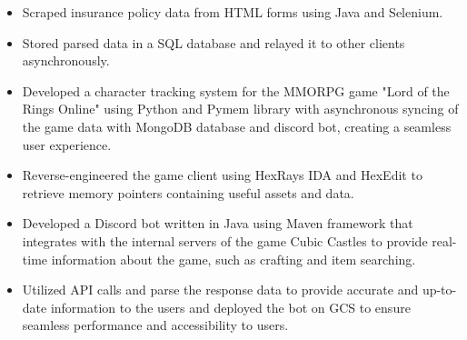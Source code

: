 \documentclass[10pt,a4paper,ragged2e]{altacv}
\begin{document}
\divider

\begin{itemize}
\item Scraped insurance policy data from HTML forms using Java and Selenium.
\item Stored parsed data in a SQL database and relayed it to other clients asynchronously.
\end{itemize}


\begin{itemize}
\item Developed a character tracking system for the MMORPG game "Lord of the Rings Online" using Python and Pymem library with asynchronous syncing of the game data with MongoDB database and discord bot, creating a seamless user experience.
\item Reverse-engineered the game client using HexRays IDA and HexEdit to retrieve memory pointers containing useful assets and data.
\end{itemize}

\divider

\begin{itemize}
\item Developed a Discord bot written in Java using Maven framework that integrates with the internal servers of the game Cubic Castles to provide real-time information about the game, such as crafting and item searching.
\item Utilized API calls and parse the response data to provide accurate and up-to-date information to the users and deployed the bot on GCS to ensure seamless performance and accessibility to users.
\end{itemize}

\clearpage

% 
% 
% 
% 
% 
% 
% 
\end{document}
